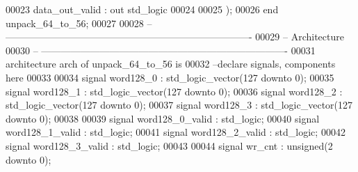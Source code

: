 \begin{DoxyCode}
00023         \textcolor{vhdlchar}{data_out_valid}  \textcolor{vhdlchar}{:} \textcolor{keywordflow}{out} \textcolor{comment}{std\_logic}
00024        
00025         \textcolor{vhdlchar}{)};
00026 \textcolor{keywordflow}{end} \textcolor{vhdlchar}{unpack\_64\_to\_56};
00027 
00028 \textcolor{keyword}{-- ----------------------------------------------------------------------------}
00029 \textcolor{keyword}{-- Architecture}
00030 \textcolor{keyword}{-- ----------------------------------------------------------------------------}
00031 \textcolor{keywordflow}{architecture} arch \textcolor{keywordflow}{of} unpack_64_to_56 is
00032 \textcolor{keyword}{--declare signals,  components here}
00033 
00034 \textcolor{keywordflow}{signal} \textcolor{vhdlchar}{word128_0}                    \textcolor{vhdlchar}{:} \textcolor{comment}{std\_logic\_vector}\textcolor{vhdlchar}{(}\textcolor{vhdllogic}{}\textcolor{vhdllogic}{127} \textcolor{keywordflow}{downto} \textcolor{vhdllogic}{}\textcolor{vhdllogic}{0}\textcolor{vhdlchar}{)};
00035 \textcolor{keywordflow}{signal} \textcolor{vhdlchar}{word128_1}                    \textcolor{vhdlchar}{:} \textcolor{comment}{std\_logic\_vector}\textcolor{vhdlchar}{(}\textcolor{vhdllogic}{}\textcolor{vhdllogic}{127} \textcolor{keywordflow}{downto} \textcolor{vhdllogic}{}\textcolor{vhdllogic}{0}\textcolor{vhdlchar}{)};
00036 \textcolor{keywordflow}{signal} \textcolor{vhdlchar}{word128_2}                    \textcolor{vhdlchar}{:} \textcolor{comment}{std\_logic\_vector}\textcolor{vhdlchar}{(}\textcolor{vhdllogic}{}\textcolor{vhdllogic}{127} \textcolor{keywordflow}{downto} \textcolor{vhdllogic}{}\textcolor{vhdllogic}{0}\textcolor{vhdlchar}{)};
00037 \textcolor{keywordflow}{signal} \textcolor{vhdlchar}{word128_3}                    \textcolor{vhdlchar}{:} \textcolor{comment}{std\_logic\_vector}\textcolor{vhdlchar}{(}\textcolor{vhdllogic}{}\textcolor{vhdllogic}{127} \textcolor{keywordflow}{downto} \textcolor{vhdllogic}{}\textcolor{vhdllogic}{0}\textcolor{vhdlchar}{)};
00038 
00039 \textcolor{keywordflow}{signal} \textcolor{vhdlchar}{word128_0_valid}      \textcolor{vhdlchar}{:} \textcolor{comment}{std\_logic};
00040 \textcolor{keywordflow}{signal} \textcolor{vhdlchar}{word128_1_valid}      \textcolor{vhdlchar}{:} \textcolor{comment}{std\_logic};
00041 \textcolor{keywordflow}{signal} \textcolor{vhdlchar}{word128_2_valid}      \textcolor{vhdlchar}{:} \textcolor{comment}{std\_logic};
00042 \textcolor{keywordflow}{signal} \textcolor{vhdlchar}{word128_3_valid}      \textcolor{vhdlchar}{:} \textcolor{comment}{std\_logic};
00043 
00044 \textcolor{keywordflow}{signal} \textcolor{vhdlchar}{wr_cnt}                       \textcolor{vhdlchar}{:} \textcolor{comment}{unsigned}\textcolor{vhdlchar}{(}\textcolor{vhdllogic}{}\textcolor{vhdllogic}{2} \textcolor{keywordflow}{downto} \textcolor{vhdllogic}{}\textcolor{vhdllogic}{0}\textcolor{vhdlchar}{)};

\end{DoxyCode}
